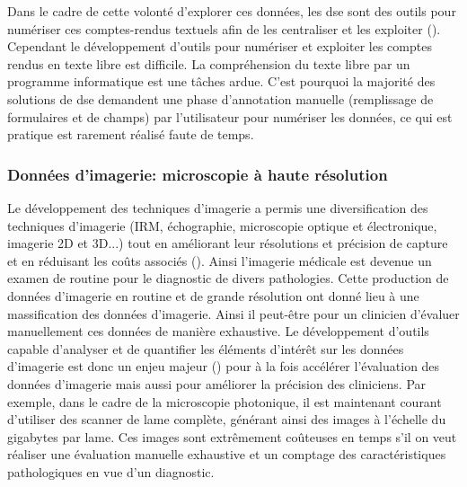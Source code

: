 Dans le cadre de cette volonté d'explorer ces données, les \gls{dse} sont des outils pour numériser ces comptes-rendus textuels afin de les centraliser et les exploiter (\cite{graber_impact_2017}). Cependant le développement d'outils pour numériser et exploiter les comptes rendus en texte libre est difficile. La compréhension du texte libre par un programme informatique est une tâches ardue. C'est pourquoi la majorité des solutions de \gls{dse} demandent une phase d'annotation manuelle (remplissage de formulaires et de champs) par l'utilisateur pour numériser les données, ce qui est pratique est rarement réalisé faute de temps.

\subsubsection{Données d'imagerie: microscopie à haute résolution}
Le développement des techniques d'imagerie a permis une diversification des techniques d'imagerie (IRM, échographie, microscopie optique et électronique, imagerie 2D et 3D...) tout en améliorant leur résolutions et précision de capture  et en réduisant les coûts associés (\cite{abdallah_history_2017, prakash_super-resolution_2022, sheppard_structured_2021}). Ainsi l'imagerie médicale est devenue un examen de routine pour le diagnostic de divers pathologies. Cette production de données d'imagerie en routine et de grande résolution ont donné lieu à une massification des données d'imagerie. Ainsi il peut-être pour un clinicien d'évaluer manuellement ces données de manière exhaustive. Le développement d'outils capable d'analyser et de quantifier les éléments d'intérêt sur les données d'imagerie est donc un enjeu majeur (\cite{tchito_tchapga_biomedical_2021}) pour à la fois accélérer l'évaluation des données d'imagerie mais aussi pour améliorer la précision des cliniciens. Par exemple, dans le cadre de la microscopie photonique, il est maintenant courant d'utiliser des scanner de lame complète, générant ainsi des images à l'échelle du gigabytes par lame. Ces images sont extrêmement coûteuses en temps s'il on veut réaliser une évaluation manuelle exhaustive et un comptage des caractéristiques pathologiques en vue d'un diagnostic.

